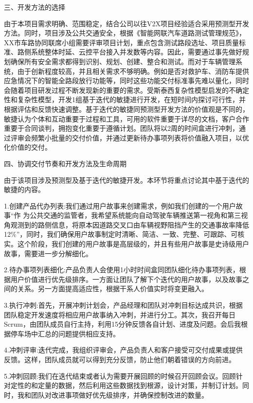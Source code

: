 \documentclass[UTF8]{../computerUniverse}
\begin{document}
三、开发方法的选择

由于本项目需求明确、范围稳定，结合公司以往V2X项目经验适合采用预测型开发方法。同时，项目涉及公共交通安全，根据《智能网联汽车道路测试管理规范》，XX市车路协同联席小组需要评审项目计划，重点包含测试路段选址、项目质量标准、路侧系统整体时延、云控平台接入并发数等内容。因此，需要通过事先做好规划确保所有安全需求都得到识别、规划、创建、整合和测试。而对于车辆管理系统，由于创新程度较高，并且相关需求不够明确。例如是否对救护车、消防车提供应急情况下的智能全路段放行功能等，同时这些功能交付标准事先难以量化，同时会随着项目研发过程不断发现新的重要的需求。受斯泰西复杂性模型启发的不确定性和复杂性模型，开发1组基于迭代的敏捷进行开发，在短时间内探讨可行性，并根据评估和反馈快速调整。基于迭代的敏捷同预测型开发方法的价值观是不同的，敏捷认为个体和互动重要于过程和工具，可用的软件重要于详尽的文档，客户合作重要于合同谈判，拥抱变化重要于遵循计划。团队将以2周的时间盒进行冲刺，通过评审会频繁小批量的交付价值，并通过更新待办事项列表将价值融入项目，以优化价值的交付。



四、协调交付节奏和开发方法及生命周期

由于该项目涉及预测型及基于迭代的敏捷开发。本环节将重点讨论其中基于迭代的敏捷的内容。

1.创建产品代办列表:我们通过用户故事来创建需求，例如我们创建的一个用户故事“作
为公共交通的监管者，我希望系统能向自动驾驶车辆推送第一视角和第三视角观测到的路侧信息，将原本因道路交叉口由车辆视野阻挡产生的交通事故率降低12\%”，同时，我们确保用户故事制定时清晰、简洁、一致、完整、可跟踪、可核实。这个阶段，我们创建的用户故事是高层级的，并且有些用户故事是史诗级用户故事，需要进一步分解细化。

2.待办事项列表细化:产品负责人会使用1小时时间盒同团队细化待办事项列表，根据用户价值进行优先级排序。一方面让团队了解下个迭代的用户故事，以及故事之间的关系。另一方面提高适应性，根据干系人价值实时将变更融入。

3.执行冲刺:首先，开展冲刺计划会，产品经理和团队对冲刺目标达成共识，根据团队稳定开发速度将相应用户故事纳入冲刺，并进行分工。其次，我召开每日Scrum，由团队成员自行主持，利用15分钟反馈各自计划、进度及问题。会后我根据停车场中汇总的问题提供相应支持。

4.冲刺评审:迭代完成，我组织评审会，产品负责人和客户接受可交付成果或提供反馈。这样，团队成员就可以得到充分反馈，防止他们朝着错误的方向前进。

5.冲刺回顾:我们在迭代结束或者认为需要开展回顾的时候召开回顾会议。回顾针对定性的和定量的数据，然后利用这些数据找到根源，设计对策，并制订计划。同时，我和团队对改进事项做好优先级排序，并确保控制改进的数量。
\end{document}
